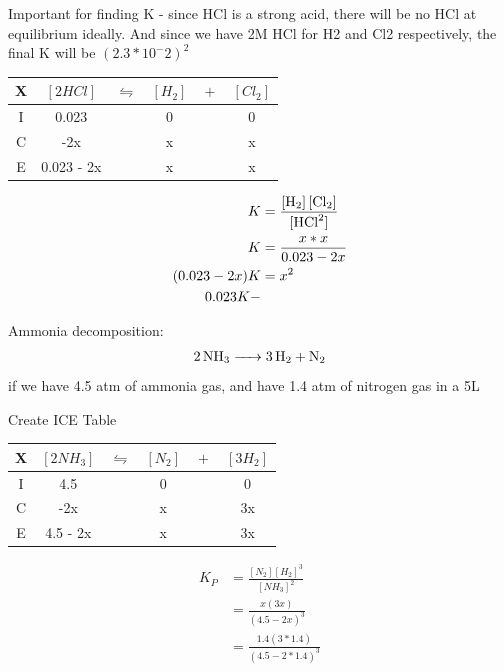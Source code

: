 \documentclass{article}  %
\begin{document}
Important for finding K - since HCl is a strong acid, there will be no HCl at equilibrium ideally. And since we have 2M HCl for H2 and Cl2 respectively, the final K will be $\left(2.3*10^-2\right)^2$

\begin{tabular}{c|c@{}c@{}c@{}c@{}c}
    \hline
    X   &   $[2HCl]$ & ${}\leftrightharpoons{}$ & $[H_2]$ & ${}+{}$ & $[Cl_2]$\\
    \hline
    I   &  0.023     &&   0                            &&  0       \\
    C   &       -2x      &&   x                           &&  x      \\
    E   &   0.023 - 2x     &&   x                           &&  x      \\
    \hline
\end{tabular}

\begin{equation*}
    \begin{aligned}
        K &= \ce{\frac{[H_2] [Cl_2]}{[HCl^2]}} \\
        K &= \frac{x*x}{0.023 - 2x} \\
        (0.023 - 2x)K &= x^2 \\
        0.023K - 
    \end{aligned}
\end{equation*}



Ammonia decomposition:
\begin{equation*}
    \begin{aligned}
        \ce{2NH3 -> 3H2 + N2}
    \end{aligned}
\end{equation*}
if we have 4.5 atm of ammonia gas, and have 1.4 atm of nitrogen gas in a 5L 

Create ICE Table \\
\begin{tabular}{c|c@{}c@{}c@{}c@{}c}
    \hline
    X   &   $[2NH_3]$ & ${}\leftrightharpoons{}$ & $[N_2]$ & ${}+{}$ & $[3H_2]$\\
    \hline
    I   &       4.5     &&   0                            &&  0       \\
    C   &       -2x      &&   x                           &&  3x      \\
    E   &   4.5 - 2x     &&   x                           &&  3x      \\
    \hline
\end{tabular}
\begin{equation*}
    \begin{aligned}
        K_P &= \frac{[N_2] [H_2]^3}{[NH_3]^2} \\
            &= \frac{x(3x)}{(4.5-2x)^3} \\
            &= \frac{1.4(3*1.4)}{(4.5-2*1.4)^3} 
    \end{aligned}
\end{equation*}
\end{document}
